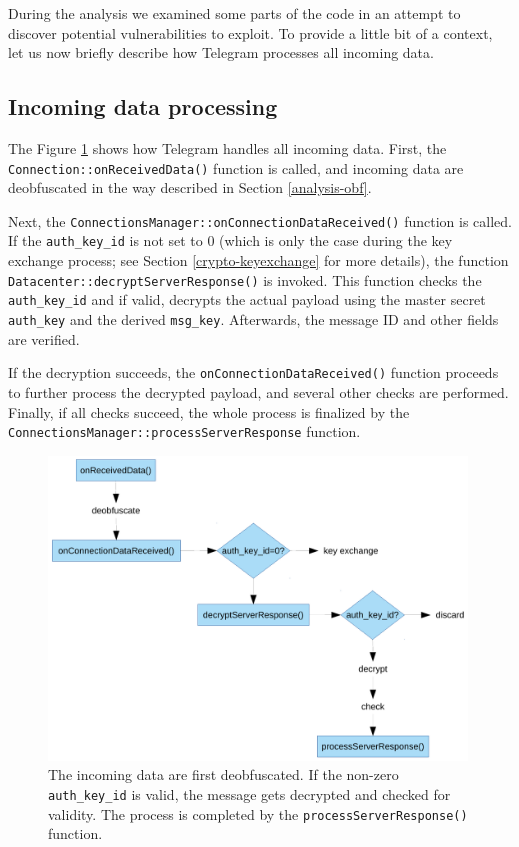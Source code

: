 \documentclass[thesis=M,english]{FITthesis}[2012/10/20]
\begin{document}
During the analysis we examined some parts of the code in an attempt to discover potential vulnerabilities to exploit. To provide a little bit of a context, let us now briefly describe how Telegram processes all incoming data.

\subsection{Incoming data processing}

The Figure \ref{img:analysis-replay-incoming} shows how Telegram handles all incoming data. First, the \texttt{Connection::onReceivedData()} function is called, and incoming data are deobfuscated in the way described in Section \ref{analysis-obf}.

Next, the \texttt{ConnectionsManager::onConnectionDataReceived()} function is called. If the \texttt{auth\_key\_id} is not set to 0 (which is only the case during the key exchange process; see Section \ref{crypto-keyexchange} for more details), the function \texttt{Datacenter::decryptServerResponse()} is invoked. This function checks the \texttt{auth\_key\_id} and if valid, decrypts the actual payload using the master secret \texttt{auth\_key} and the derived \texttt{msg\_key}. Afterwards, the message ID and other fields are verified.

If the decryption succeeds, the \texttt{onConnectionDataReceived()} function proceeds to further process the decrypted payload, and several other checks are performed. Finally, if all checks succeed, the whole process is finalized by the \texttt{ConnectionsManager::processServerResponse} function.

\begin{figure}[htb]
	\centering
	\includegraphics[width=0.99\textwidth]{incoming-flow.pdf}
	\caption[Incoming data processing]{The incoming data are first deobfuscated. If the non-zero \texttt{auth\_key\_id} is valid, the message gets decrypted and checked for validity. The process is completed by the \texttt{processServerResponse()} function.}
	\label{img:analysis-replay-incoming}
\end{figure}
\end{document}
